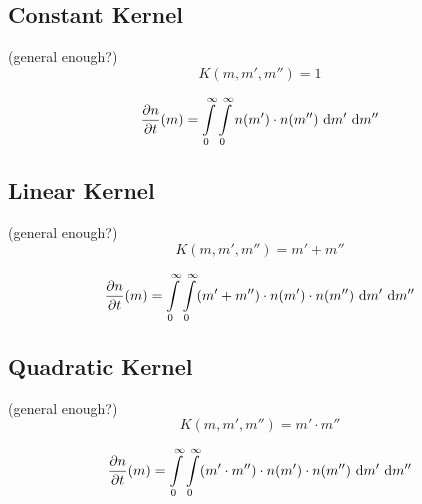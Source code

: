     \subsection{Constant Kernel}

     (general enough?)
    \begin{equation}
        K(m, m', m'')
            = 1
    \end{equation}

    \begin{equation}
        \frac{\partial n}{\partial t}(m)
            = 
                \int\limits_0^\infty \int\limits_0^\infty
                n(m') \cdot n(m'')
                \ \text{d} m' \ \text{d} m''
    \end{equation}

    \subsection{Linear Kernel}

     (general enough?)
    \begin{equation}
        K(m, m', m'')
            = m' + m''
    \end{equation}

    \begin{equation}
        \frac{\partial n}{\partial t}(m)
            = 
                \int\limits_0^\infty \int\limits_0^\infty
                (m' + m'') \cdot
                n(m') \cdot n(m'')
                \ \text{d} m' \ \text{d} m''
    \end{equation}

    \subsection{Quadratic Kernel}

     (general enough?)
    \begin{equation}
        K(m, m', m'')
            = m' \cdot m''
    \end{equation}

    \begin{equation}
        \frac{\partial n}{\partial t}(m)
            = 
                \int\limits_0^\infty \int\limits_0^\infty
                (m' \cdot m'') \cdot
                n(m') \cdot n(m'')
                \ \text{d} m' \ \text{d} m''
    \end{equation}

